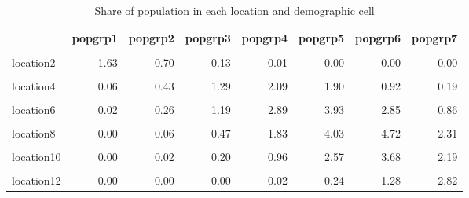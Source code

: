 \documentclass[
]{book}
\begin{document}
\begin{table}[!h]

\caption{\label{tab:unnamed-chunk-236}Share of population in each location and demographic cell}
\centering
\begin{tabular}[t]{l|r|r|r|r|r|r|r}
\hline
  & popgrp1 & popgrp2 & popgrp3 & popgrp4 & popgrp5 & popgrp6 & popgrp7\\
\hline
\cellcolor{gray!6}{location1} & \cellcolor{gray!6}{1.09} & \cellcolor{gray!6}{0.13} & \cellcolor{gray!6}{0.01} & \cellcolor{gray!6}{0.00} & \cellcolor{gray!6}{0.00} & \cellcolor{gray!6}{0.00} & \cellcolor{gray!6}{0.00}\\
\hline
location2 & 1.63 & 0.70 & 0.13 & 0.01 & 0.00 & 0.00 & 0.00\\
\hline
\cellcolor{gray!6}{location3} & \cellcolor{gray!6}{0.59} & \cellcolor{gray!6}{1.40} & \cellcolor{gray!6}{1.39} & \cellcolor{gray!6}{0.74} & \cellcolor{gray!6}{0.22} & \cellcolor{gray!6}{0.03} & \cellcolor{gray!6}{0.00}\\
\hline
location4 & 0.06 & 0.43 & 1.29 & 2.09 & 1.90 & 0.92 & 0.19\\
\hline
\cellcolor{gray!6}{location5} & \cellcolor{gray!6}{0.07} & \cellcolor{gray!6}{0.55} & \cellcolor{gray!6}{1.73} & \cellcolor{gray!6}{2.89} & \cellcolor{gray!6}{2.71} & \cellcolor{gray!6}{1.36} & \cellcolor{gray!6}{0.28}\\
\hline
location6 & 0.02 & 0.26 & 1.19 & 2.89 & 3.93 & 2.85 & 0.86\\
\hline
\cellcolor{gray!6}{location7} & \cellcolor{gray!6}{0.01} & \cellcolor{gray!6}{0.10} & \cellcolor{gray!6}{0.66} & \cellcolor{gray!6}{2.23} & \cellcolor{gray!6}{4.26} & \cellcolor{gray!6}{4.33} & \cellcolor{gray!6}{1.83}\\
\hline
location8 & 0.00 & 0.06 & 0.47 & 1.83 & 4.03 & 4.72 & 2.31\\
\hline
\cellcolor{gray!6}{location9} & \cellcolor{gray!6}{0.00} & \cellcolor{gray!6}{0.03} & \cellcolor{gray!6}{0.27} & \cellcolor{gray!6}{1.26} & \cellcolor{gray!6}{3.28} & \cellcolor{gray!6}{4.55} & \cellcolor{gray!6}{2.63}\\
\hline
location10 & 0.00 & 0.02 & 0.20 & 0.96 & 2.57 & 3.68 & 2.19\\
\hline
\cellcolor{gray!6}{location11} & \cellcolor{gray!6}{0.00} & \cellcolor{gray!6}{0.00} & \cellcolor{gray!6}{0.00} & \cellcolor{gray!6}{0.04} & \cellcolor{gray!6}{0.40} & \cellcolor{gray!6}{2.05} & \cellcolor{gray!6}{4.38}\\
\hline
location12 & 0.00 & 0.00 & 0.00 & 0.02 & 0.24 & 1.28 & 2.82\\
\hline
\end{tabular}
\end{table}
\end{document}
